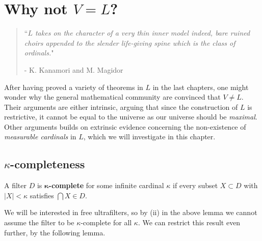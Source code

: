 \chapter{Why not $V{=}L$?}
\thispagestyle{fancy}

\begin{quote}
``\textit{$L$ takes on the character of a very thin inner model indeed, bare ruined choirs appended to the slender life-giving spine which is the class of ordinals.}"

 - K. Kanamori and M. Magidor \cite{KanamoriMagidor}\\
\end{quote}

After having proved a variety of theorems in $L$ in the last chapters, one might wonder why the general mathematical community are convinced that $V{\neq}L$. Their arguments are either intrinsic, arguing that since the construction of $L$ is restrictive, it cannot be equal to the universe as our universe should be \textit{maximal}. Other arguments builds on extrinsic evidence concerning the non-existence of \textit{measurable cardinals} in $L$, which we will investigate in this chapter.

\section{$\kappa$-completeness}
A filter $D$ is $\boldsymbol\kappa$\textbf{-complete} for some infinite cardinal $\kappa$ if every subset $X\subset D$ with $|X|<\kappa$ satisfies $\bigcap X\in D$.


We will be interested in free ultrafilters, so by (ii) in the above lemma we cannot assume the filter to be $\kappa$-complete for all $\kappa$. We can restrict this result even further, by the following lemma.


